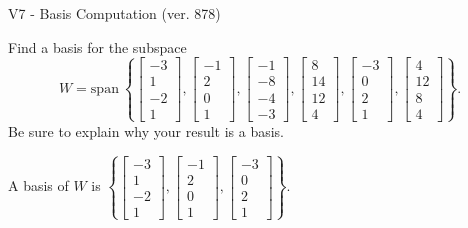 \begin{exercise}
  \begin{exerciseTitle}V7 - Basis Computation (ver. 878)\end{exerciseTitle}
  \begin{exerciseStatement}
    Find a basis for the subspace 
\[W=\mathrm{span}\ \left\{\left[\begin{array}{r}
-3 \\
1 \\
-2 \\
1
\end{array}\right] , \left[\begin{array}{r}
-1 \\
2 \\
0 \\
1
\end{array}\right] , \left[\begin{array}{r}
-1 \\
-8 \\
-4 \\
-3
\end{array}\right] , \left[\begin{array}{r}
8 \\
14 \\
12 \\
4
\end{array}\right] , \left[\begin{array}{r}
-3 \\
0 \\
2 \\
1
\end{array}\right] , \left[\begin{array}{r}
4 \\
12 \\
8 \\
4
\end{array}\right]\right\}.\]
 Be sure to explain why your result is a basis.


  \end{exerciseStatement}
  \begin{exerciseAnswer}
   A basis of \(W\) is  \(\left\{\left[\begin{array}{r}
-3 \\
1 \\
-2 \\
1
\end{array}\right] , \left[\begin{array}{r}
-1 \\
2 \\
0 \\
1
\end{array}\right] , \left[\begin{array}{r}
-3 \\
0 \\
2 \\
1
\end{array}\right]\right\}\).
  


  \end{exerciseAnswer}
\end{exercise}